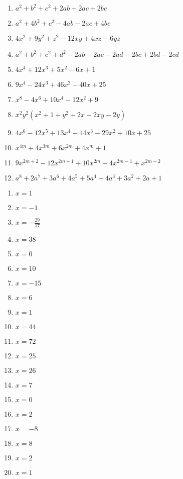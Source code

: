 \begin{solution} \hfill \vspace{-0.5cm}
\begin{enumerate}
\item ${{a}^{2}}+{{b}^{2}}+{{c}^{2}}+2ab+2ac+2bc$
\item ${{a}^{2}}+4{{b}^{2}}+{{c}^{2}}-4ab-2ac+4bc$
\item $4{{x}^{2}}+9{{y}^{2}}+{{z}^{2}}-12xy+4xz-6yz$ 
\item ${{a}^{2}}+{{b}^{2}}+{{c}^{2}}+{{d}^{2}}-2ab+2ac-2ad-2bc+2bd-2cd$
\item $4{{x}^{4}}+12{{x}^{3}}+5{{x}^{2}}-6x+1$
\item $9{{x}^{4}}-24x{}^{3}+46{{x}^{2}}-40x+25$
\item ${{x}^{8}}-4{{x}^{6}}+10{{x}^{4}}-12{{x}^{2}}+9$
\item ${{x}^{2}}{{y}^{2}}({{x}^{2}}+1+{{y}^{2}}+2x-2xy-2y)$
\item $4{{x}^{6}}-12{{x}^{5}}+13{{x}^{4}}+14{{x}^{3}}-29{{x}^{2}}+10x+25$
\item ${{x}^{4m}}+4{{x}^{3m}}+6{{x}^{2m}}+4{{x}^{m}}+1$
\item $9{{x}^{2m+2}}-12{{x}^{2m+1}}+10{{x}^{2m}}-4{{x}^{2m-1}}+{{x}^{2m-2}}$
\item ${{a}^{8}}+2{{a}^{7}}+3{{a}^{6}}+4{{a}^{5}}+5{{a}^{4}}+4{{a}^{3}}+3{{a}^{2}}+2a+1$ 
\end{enumerate}
\end{solution}
 
\begin{solution} \hfill \vspace{-0.8cm}
\begin{multicols}{4}
\begin{enumerate}
\item $x=1$	
\item $x=-1$	
\item $x=-\frac{29}{17}$	
\item $x=38$	
\item $x=0$	
\item $x=10$	
\item $x=-15$	
\item $x=6$	
\item $x=1$	
\item $x=44$	
\item $x=72$	
\item $x=25$	
\item $x=26$	
\item $x=7$	
\item $x=0$	
\item $x=2$	
\item $x=-8$
\item $x=8$
\item $x=2$
\item $x=1$
\end{enumerate}
\end{multicols}
\end{solution}

